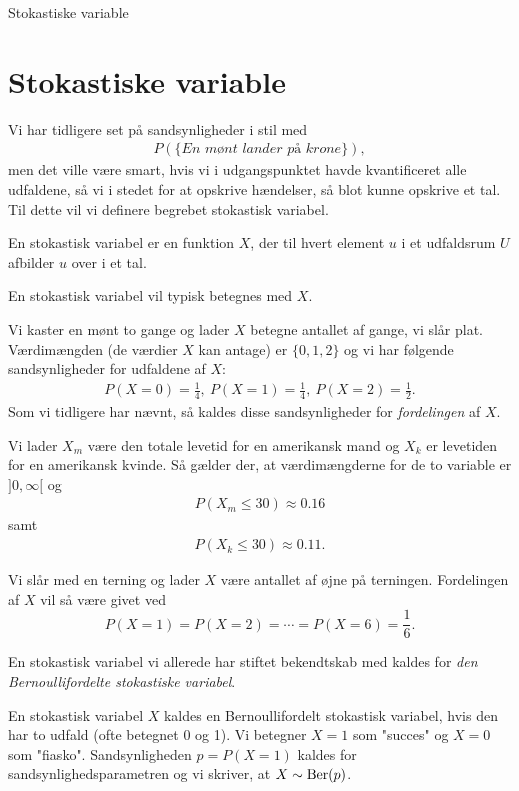 \begin{center}
\Huge
Stokastiske variable
\end{center}
\section*{Stokastiske variable}

Vi har tidligere set på sandsynligheder i stil med 
\begin{align*}
P(\{\textit{En mønt lander på krone}\}),
\end{align*}
men det ville være smart, hvis vi i udgangspunktet havde kvantificeret alle udfaldene, så vi i stedet for at opskrive hændelser, så blot kunne opskrive et tal. Til dette vil vi definere begrebet stokastisk variabel.
\begin{defn}
	En stokastisk variabel er en funktion $X$, der til hvert element $u$ i et udfaldsrum $U$ afbilder $u$ over i et tal.  
\end{defn}
En stokastisk variabel vil typisk betegnes med $X$.
\begin{exa}
Vi kaster en mønt to gange og lader $X$ betegne antallet af gange, vi slår plat. Værdimængden (de værdier $X$ kan antage) er $\{0,1,2\}$ og vi har følgende sandsynligheder for udfaldene af $X$:
\begin{align*}
P(X=0) = \frac{1}{4}, \ P(X=1) = \frac{1}{4}, \ P(X=2) = \frac{1}{2}. 
\end{align*}
Som vi tidligere har nævnt, så kaldes disse sandsynligheder for \textit{fordelingen} af $X$.
\end{exa}
\begin{exa}
Vi lader $X_m$ være den totale levetid for en amerikansk mand og $X_k$ er levetiden for en amerikansk kvinde. Så gælder der, at værdimængderne for de to variable er $]0,\infty[$ og
\begin{align*}
P(X_m\leq 30) \approx 0.16
\end{align*} 
samt
\begin{align*}
P(X_k\leq 30) \approx 0.11.
\end{align*}
\end{exa}
\begin{exa}
Vi slår med en terning og lader $X$ være antallet af øjne på terningen. Fordelingen af $X$ vil så være givet ved
\[P(X=1) = P(X=2) = \cdots = P(X=6) = \frac{1}{6}.\]
\end{exa}

En stokastisk variabel vi allerede har stiftet bekendtskab med kaldes for \textit{den Bernoullifordelte stokastiske variabel}.
\begin{defn}
En stokastisk variabel $X$ kaldes en Bernoullifordelt stokastisk variabel, hvis den har to udfald (ofte betegnet $0$ og 1). Vi betegner $X=1$ som "succes" og $X=0$ som "fiasko". Sandsynligheden $p= P(X=1)$ kaldes for sandsynlighedsparametren og vi skriver, at $X \sim \textnormal{Ber}(p)$. 
\end{defn}

